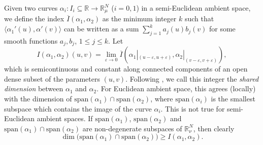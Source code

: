 \documentclass{article}
\theoremstyle{remark}
\begin{document}
Given two curves $\alpha_i:I_i\subseteq\mathbb{R}\rightarrow\mathbb{R}^N_\mu$ ($i=0,1$) in a semi-Euclidean ambient space, we define the index $\overline{I}(\alpha_1,\alpha_2)$ as the minimum integer $k$ such that $\langle\alpha_1'(u),\alpha'(v)\rangle$ can be written as a sum $\sum_{j=1}^k a_j(u)b_j(v)$ for some smooth functions $a_j,b_j$, $1\leq j\leq k$. Let
$$I(\alpha_1,\alpha_2)(u,v)=\lim_{\varepsilon\to0}\overline{I}(\alpha_1|_{(u-\varepsilon,u+\varepsilon)},\alpha_2|_{(v-\varepsilon,v+\varepsilon)}),$$
which is semicontinuous and constant along connected components of an open dense subset of the parameters $(u,v)$. Following \cite{FF}, we call this integer the {\it shared dimension} between $\alpha_1$ and $\alpha_2$. For Euclidean ambient space, this agrees (locally) with the dimension of $\text{span}(\alpha_1)\cap\text{span}(\alpha_2)$, where $\text{span}(\alpha_i)$ is the smallest subspace which contains the image of the curve $\alpha_i$. This is not true for semi-Euclidean ambient spaces. 
If $\text{span}(\alpha_1)$, $\text{span}(\alpha_2)$ and $\text{span}(\alpha_1)\cap\text{span}(\alpha_2)$ are non-degenerate subspaces of $\mathbb{R}^{N}_\nu$, then clearly $$\dim\Big(\text{span}(\alpha_1)\cap\text{span}(\alpha_2)\Big)\geq I(\alpha_1,\alpha_2).$$
\end{document}
